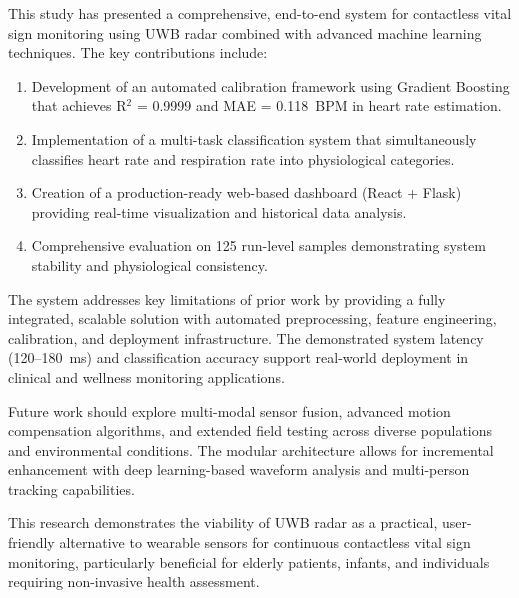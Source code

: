 \documentclass[conference]{IEEEtran}
\begin{document}
This study has presented a comprehensive, end-to-end system for contactless vital sign monitoring using UWB radar combined with advanced machine learning techniques. The key contributions include:

\begin{enumerate}
\item Development of an automated calibration framework using Gradient Boosting that achieves R$^2$ = 0.9999 and MAE = 0.118~BPM in heart rate estimation.
\item Implementation of a multi-task classification system that simultaneously classifies heart rate and respiration rate into physiological categories.
\item Creation of a production-ready web-based dashboard (React + Flask) providing real-time visualization and historical data analysis.
\item Comprehensive evaluation on 125 run-level samples demonstrating system stability and physiological consistency.
\end{enumerate}

The system addresses key limitations of prior work by providing a fully integrated, scalable solution with automated preprocessing, feature engineering, calibration, and deployment infrastructure. The demonstrated system latency (120--180~ms) and classification accuracy support real-world deployment in clinical and wellness monitoring applications.

Future work should explore multi-modal sensor fusion, advanced motion compensation algorithms, and extended field testing across diverse populations and environmental conditions. The modular architecture allows for incremental enhancement with deep learning-based waveform analysis and multi-person tracking capabilities.

This research demonstrates the viability of UWB radar as a practical, user-friendly alternative to wearable sensors for continuous contactless vital sign monitoring, particularly beneficial for elderly patients, infants, and individuals requiring non-invasive health assessment.
\end{document}

